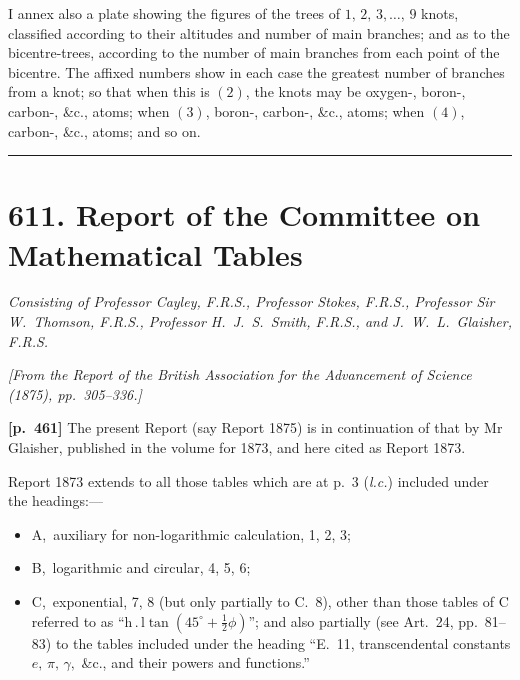 \documentclass[11pt,a4paper]{article}
\begin{document}
I annex also a plate showing the figures of the trees of $1,\,2,\,3,\ldots,\,9$ knots, classified according to their altitudes and number of main branches; and as to the bicentre-trees, according to the number of main branches from each point of the bicentre. The affixed numbers show in each case the greatest number of branches from a knot; so that when this is $(2)$, the knots may be oxygen-, boron-, carbon-, \&c., atoms; when $(3)$, boron-, carbon-, \&c., atoms; when $(4)$, carbon-, \&c., atoms; and so on.

\begin{center}
\par\noindent{}\par
\end{center}

\bigskip
\hrule
\bigskip

\section*{\textbf{611.} Report of the Committee on Mathematical Tables}

\textit{Consisting of Professor Cayley, F.R.S., Professor Stokes, F.R.S., Professor Sir W.~Thomson, F.R.S., Professor H.~J.~S.~Smith, F.R.S., and J.~W.~L.~Glaisher, F.R.S.}

\medskip
\noindent\textit{[From the Report of the British Association for the Advancement of Science (1875), pp.~305--336.]}

\bigskip
\noindent\textbf{[p.~461]}\quad
The present Report (say Report 1875) is in continuation of that by Mr Glaisher, published in the volume for 1873, and here cited as Report 1873.

Report 1873 extends to all those tables which are at p.~3 (\textit{l.c.}) included under the headings:---
\begin{itemize}
\item[] A,\ auxiliary for non-logarithmic calculation, 1, 2, 3;
\item[] B,\ logarithmic and circular, 4, 5, 6;
\item[] C,\ exponential, 7, 8 (but only partially to C.~8), other than those tables of C referred to as ``h$\,.\,$l$\tan(45^\circ+\tfrac{1}{2}\phi)$''; and also partially (see Art.~24, pp.~81--83) to the tables included under the heading ``E.~11, transcendental constants $e,\,\pi,\,\gamma,$ \&c., and their powers and functions.''
\end{itemize}
\end{document}
